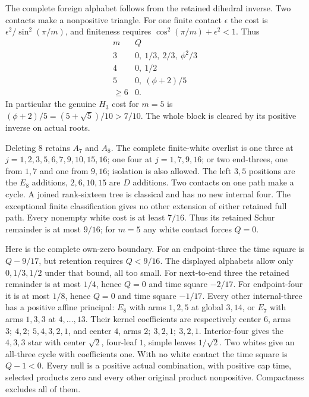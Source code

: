 \documentclass[11pt]{article}
\theoremstyle{definition}
\theoremstyle{remark}
\begin{document}
The complete foreign alphabet follows from the retained dihedral
inverse. Two contacts make a nonpositive triangle.
For one finite contact \(\epsilon\) the cost is
\(\epsilon^2/\sin^2(\pi/m)\), and finiteness requires
\(\cos^2(\pi/m)+\epsilon^2<1\). Thus
\[
\begin{array}{c|c}
m& Q\\ \hline
3&0,\ 1/3,\ 2/3,\ \phi^2/3\\
4&0,\ 1/2\\
5&0,\ (\phi+2)/5\\
\geq6&0 .
\end{array}
\]
In particular the genuine \(H_3\) cost for \(m=5\) is
\((\phi+2)/5=(5+\sqrt5)/10>7/10\).
The whole block is cleared by its positive inverse on actual roots.

Deleting \(8\) retains \(A_7\) and \(A_8\).
The complete finite-white overlist is one three at
\(j=1,\allowbreak 2,\allowbreak 3,\allowbreak 5,\allowbreak 6,\allowbreak 7,\allowbreak 9,\allowbreak 10,\allowbreak 15,\allowbreak 16\);
one four at \(j=1,\allowbreak 7,\allowbreak 9,\allowbreak 16\);
or two end-threes, one from \(1,\allowbreak 7\) and one from \(9,\allowbreak 16\);
isolation is also allowed.
The left \(3,\allowbreak 5\) positions are the \(E_8\) additions,
\(2,\allowbreak 6,\allowbreak 10,\allowbreak 15\) are \(D\) additions. Two contacts on one path
make a cycle. A joined rank-sixteen tree is classical and has
no new internal four. The exceptional finite classification gives
no other extension of either retained full path.
Every nonempty white cost is at least \(7/16\).
Thus its retained Schur remainder is at most \(9/16\);
for \(m=5\) any white contact forces \(Q=0\).

Here is the complete own-zero boundary.
For an endpoint-three the time square is \(Q-9/17\), but
retention requires \(Q<9/16\). The displayed alphabets allow only
\(0,1/3,1/2\) under that bound, all too small.
For next-to-end three the retained remainder is at most \(1/4\),
hence \(Q=0\) and time square \(-2/17\).
For endpoint-four it is at most \(1/8\), hence \(Q=0\)
and time square \(-1/17\).
Every other internal-three has a positive affine principal:
\(E_8\) with arms \(1,2,5\) at global \(3,14\), or
\(E_7\) with arms \(1,3,3\) at \(4,\ldots,13\).
Their kernel coefficients are respectively center \(6\), arms
\(3;\ 4,2;\ 5,4,3,2,1\), and center \(4\), arms
\(2;\ 3,2,1;\ 3,2,1\).
Interior-four gives the \(4,3,3\) star with center \(\sqrt2\),
four-leaf \(1\), simple leaves \(1/\sqrt2\).
Two whites give an all-three cycle with coefficients one.
With no white contact the time square is \(Q-1<0\).
Every null is a positive actual combination, with positive cap
time, selected products zero and every other original product
nonpositive. Compactness excludes all of them.
\end{document}
